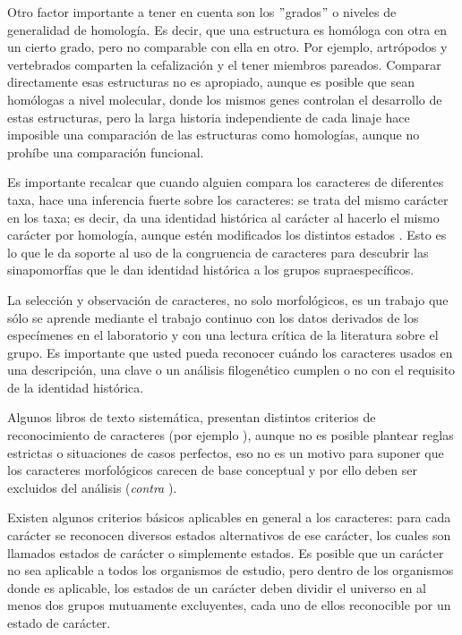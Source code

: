 Otro factor importante a tener en cuenta son los $"$grados$"$ o niveles 
de generalidad de homolog\'ia. Es decir, que una estructura es 
hom\'ologa con otra en un cierto grado, pero no comparable con ella en 
otro. Por ejemplo, artr\'opodos y vertebrados comparten la 
cefalizaci\'on y el tener miembros pareados. Comparar directamente esas 
estructuras no es apropiado, aunque es posible que sean hom\'ologas a 
nivel molecular, donde los mismos genes controlan el desarrollo de 
estas estructuras, pero la larga historia independiente de cada linaje 
hace imposible una comparaci\'on de las estructuras como homolog\'ias, 
aunque no proh\'ibe una comparaci\'on funcional.

Es importante recalcar que cuando alguien compara los caracteres de 
diferentes taxa, hace una inferencia fuerte sobre los caracteres: se 
trata del mismo car\'acter en los taxa; es decir, da una identidad 
hist\'orica al car\'acter al hacerlo el mismo car\'acter por 
homolog\'ia, aunque est\'en modificados los distintos estados  
\citep{Hennig1968}. Esto es lo que le da soporte al uso de la 
congruencia de caracteres para descubrir las sinapomorf\'ias que le dan 
identidad hist\'orica a los grupos supraespec\'ificos.

 
La selecci\'on y observaci\'on de caracteres, no solo morfol\'ogicos, 
es un trabajo que s\'olo se aprende mediante el trabajo continuo con 
los datos derivados de los espec\'imenes en el laboratorio y con una 
lectura cr\'itica de la literatura sobre el grupo. Es importante que 
usted pueda reconocer cu\'ando los caracteres usados en una 
descripci\'on, una clave o un an\'alisis filogen\'etico cumplen o no 
con el requisito de la identidad hist\'orica.


Algunos libros de texto  sistem\'atica, presentan distintos criterios 
de reconocimiento de caracteres (por ejemplo 
\cite{Hennig1968,wiley2011}), aunque no es posible plantear reglas 
estrictas o situaciones de casos perfectos, eso no es un motivo para 
suponer que los caracteres morfol\'ogicos carecen de base conceptual y 
por ello deben ser excluidos del an\'alisis (\textit{contra} 
\cite{Scotland2003}).

Existen algunos criterios b\'asicos aplicables en general a los 
caracteres: para cada car\'acter se reconocen diversos estados 
alternativos de ese car\'acter, los cuales son llamados estados de 
car\'acter o simplemente estados. Es posible que un car\'acter no sea 
aplicable a todos los organismos de estudio, pero dentro de los 
organismos donde es aplicable, los estados de un car\'acter deben 
dividir el universo en al menos dos grupos mutuamente excluyentes, cada 
uno de ellos reconocible por un estado de car\'acter.


